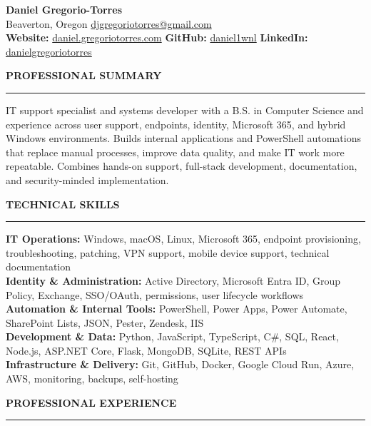 \documentclass[letterpaper,10pt]{article}
\newcommand{\resumesection}[1]{%
  \vspace{6pt}
  {\large\bfseries\MakeUppercase{#1}}\par
  \vspace{2pt}
  \hrule
  \vspace{3.5pt}
}
\begin{document}
\begin{center}
  {\LARGE\bfseries Daniel Gregorio-Torres}\\[4pt]
  Beaverton, Oregon \textbar{}
  \href{mailto:djgregoriotorres@gmail.com}{djgregoriotorres@gmail.com} %
  \\[2pt]
  \textbf{Website:} \href{https://daniel.gregoriotorres.com/}{daniel.gregoriotorres.com} \textbar{}
  \textbf{GitHub:} \href{https://github.com/daniel1wnl}{daniel1wnl} \textbar{}
  \textbf{LinkedIn:} \href{https://linkedin.com/in/danielgregoriotorres}{danielgregoriotorres}
\end{center}

\resumesection{Professional Summary}

IT support specialist and systems developer with a B.S. in Computer Science and experience across user support, endpoints, identity, Microsoft 365, and hybrid Windows environments. Builds internal applications and PowerShell automations that replace manual processes, improve data quality, and make IT work more repeatable. Combines hands-on support, full-stack development, documentation, and security-minded implementation.

\resumesection{Technical Skills}

\textbf{IT Operations:} Windows, macOS, Linux, Microsoft 365, endpoint provisioning, troubleshooting, patching, VPN support, mobile device support, technical documentation\\
\textbf{Identity \& Administration:} Active Directory, Microsoft Entra ID, Group Policy, Exchange, SSO/OAuth, permissions, user lifecycle workflows\\
\textbf{Automation \& Internal Tools:} PowerShell, Power Apps, Power Automate, SharePoint Lists, JSON, Pester, Zendesk, IIS\\
\textbf{Development \& Data:} Python, JavaScript, TypeScript, C\#, SQL, React, Node.js, ASP.NET Core, Flask, MongoDB, SQLite, REST APIs\\
\textbf{Infrastructure \& Delivery:} Git, GitHub, Docker, Google Cloud Run, Azure, AWS, monitoring, backups, self-hosting

\resumesection{Professional Experience}
\end{document}

